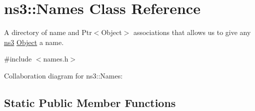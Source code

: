 \hypertarget{classns3_1_1Names}{}\section{ns3\+:\+:Names Class Reference}
\label{classns3_1_1Names}


A directory of name and Ptr$<$\+Object$>$ associations that allows us to give any \hyperlink{namespacens3}{ns3} \hyperlink{classns3_1_1Object}{Object} a name.  




{\ttfamily \#include $<$names.\+h$>$}



Collaboration diagram for ns3\+:\+:Names\+:
\subsection*{Static Public Member Functions}
